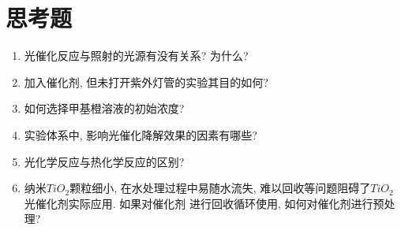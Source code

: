 \documentclass[a4paper]{article}
\begin{document}
\section{思考题}
\begin{enumerate}
	\item 光催化反应与照射的光源有没有关系? 为什么?
	\item 加入催化剂, 但未打开紫外灯管的实验其目的如何?
	\item 如何选择甲基橙溶液的初始浓度?
	\item 实验体系中, 影响光催化降解效果的因素有哪些?
	\item 光化学反应与热化学反应的区别?
	\item 纳米$TiO_{2}$颗粒细小, 在水处理过程中易随水流失, 
	难以回收等问题阻碍了$TiO_{2}$光催化剂实际应用. 如果对催化剂
	进行回收循环使用, 如何对催化剂进行预处理?
\end{enumerate}
\end{document}
